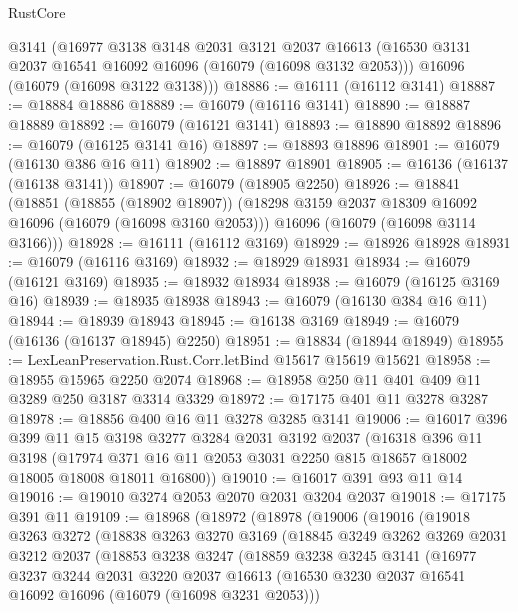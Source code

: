 \begin{lexlean}{RustCore}
\begin{coremodule}
    @3141
    (@16977
      @3138
      @3148
      @2031
      @3121
      @2037
      @16613
      (@16530 @3131 @2037 @16541 @16092 @16096 (@16079 (@16098 @3132 @2053)))
      @16096
      (@16079 (@16098 @3122 @3138)))
@18886 := @16111 (@16112 @3141)
@18887 := @18884 @18886
@18889 := @16079 (@16116 @3141)
@18890 := @18887 @18889
@18892 := @16079 (@16121 @3141)
@18893 := @18890 @18892
@18896 := @16079 (@16125 @3141 @16)
@18897 := @18893 @18896
@18901 := @16079 (@16130 @386 @16 @11)
@18902 := @18897 @18901
@18905 := @16136 (@16137 (@16138 @3141))
@18907 := @16079 (@18905 @2250)
@18926 := @18841
    (@18851
      (@18855 (@18902 @18907))
      (@18298 @3159 @2037 @18309 @16092 @16096 (@16079 (@16098 @3160 @2053)))
      @16096
      (@16079 (@16098 @3114 @3166)))
@18928 := @16111 (@16112 @3169)
@18929 := @18926 @18928
@18931 := @16079 (@16116 @3169)
@18932 := @18929 @18931
@18934 := @16079 (@16121 @3169)
@18935 := @18932 @18934
@18938 := @16079 (@16125 @3169 @16)
@18939 := @18935 @18938
@18943 := @16079 (@16130 @384 @16 @11)
@18944 := @18939 @18943
@18945 := @16138 @3169
@18949 := @16079 (@16136 (@16137 @18945) @2250)
@18951 := @18834 (@18944 @18949)
@18955 := LexLeanPreservation.Rust.Corr.letBind @15617 @15619 @15621
@18958 := @18955 @15965 @2250 @2074
@18968 := @18958 @250 @11 @401 @409 @11 @3289 @250 @3187 @3314 @3329
@18972 := @17175 @401 @11 @3278 @3287
@18978 := @18856 @400 @16 @11 @3278 @3285 @3141
@19006 := @16017
    @396
    @399
    @11
    @15
    @3198
    @3277
    @3284
    @2031
    @3192
    @2037
    (@16318
      @396
      @11
      @3198
      (@17974 @371 @16 @11 @2053 @3031 @2250 @815 @18657 @18002 @18005 @18008 @18011 @16800))
@19010 := @16017 @391 @93 @11 @14
@19016 := @19010 @3274 @2053 @2070 @2031 @3204 @2037
@19018 := @17175 @391 @11
@19109 := @18968
    (@18972
      (@18978
        (@19006
          (@19016
            (@19018
              @3263
              @3272
              (@18838
                @3263
                @3270
                @3169
                (@18845
                  @3249
                  @3262
                  @3269
                  @2031
                  @3212
                  @2037
                  (@18853
                    @3238
                    @3247
                    (@18859
                      @3238
                      @3245
                      @3141
                      (@16977
                        @3237
                        @3244
                        @2031
                        @3220
                        @2037
                        @16613
                        (@16530 @3230 @2037 @16541 @16092 @16096 (@16079 (@16098 @3231 @2053)))

\end{coremodule}
\end{lexlean}
